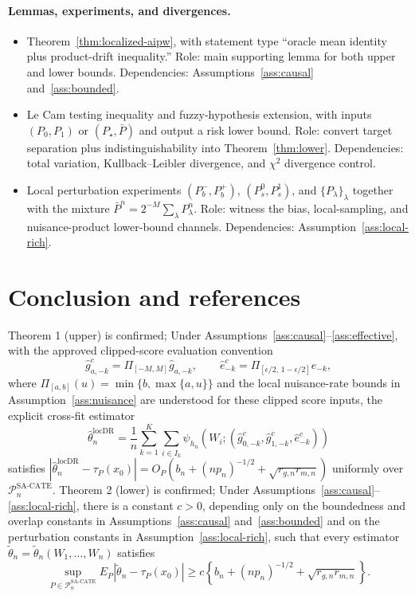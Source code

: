 \documentclass[11pt]{article}
\theoremstyle{definition}
\theoremstyle{plain}
\theoremstyle{remark}
\begin{document}
\paragraph{Lemmas, experiments, and divergences.}
\begin{itemize}[leftmargin=*]
  \item Theorem~\ref{thm:localized-aipw}, with statement type ``oracle mean identity plus product-drift inequality.'' Role: main supporting lemma for both upper and lower bounds. Dependencies: Assumptions~\ref{ass:causal} and~\ref{ass:bounded}.
  \item Le Cam testing inequality and fuzzy-hypothesis extension, with inputs $(P_0,P_1)$ or $(P_\star,\bar P)$ and output a risk lower bound. Role: convert target separation plus indistinguishability into Theorem~\ref{thm:lower}. Dependencies: total variation, Kullback--Leibler divergence, and $\chi^2$ divergence control.
  \item Local perturbation experiments $(P_b^-,P_b^+)$, $(P_s^0,P_s^1)$, and $\{P_\lambda\}_{\lambda}$ together with the mixture $\bar P^n=2^{-M}\sum_\lambda P_\lambda^n$. Role: witness the bias, local-sampling, and nuisance-product lower-bound channels. Dependencies: Assumption~\ref{ass:local-rich}.
\end{itemize}

\section{Conclusion and references}
Theorem 1 (upper) is confirmed; Under Assumptions~\ref{ass:causal}--\ref{ass:effective}, with the approved clipped-score evaluation convention
\[
\hat g^c_{a,-k}=\Pi_{[-M,M]}\hat g_{a,-k},\qquad \hat e^c_{-k}=\Pi_{[\epsilon/2,\,1-\epsilon/2]}\hat e_{-k},
\]
where $\Pi_{[a,b]}(u)=\min\{b,\max\{a,u\}\}$ and the local nuisance-rate bounds in Assumption~\ref{ass:nuisance} are understood for these clipped score inputs, the explicit cross-fit estimator
\[
\hat\theta_n^{\mathrm{locDR}} = \frac{1}{n}\sum_{k=1}^K\sum_{i\in I_k} \psi_{h_n}\!\left(W_i;(\hat g^c_{0,-k},\hat g^c_{1,-k},\hat e^c_{-k})\right)
\]
satisfies $\left|\hat\theta_n^{\mathrm{locDR}}-\tau_P(x_0)\right|=O_P\!\left(b_n+(n p_n)^{-1/2}+\sqrt{r_{g,n}r_{m,n}}\right)$ uniformly over $\mathcal{P}_n^{\mathrm{SA\text{-}CATE}}$. Theorem 2 (lower) is confirmed; Under Assumptions~\ref{ass:causal}--\ref{ass:local-rich}, there is a constant $c>0$, depending only on the boundedness and overlap constants in Assumptions~\ref{ass:causal} and~\ref{ass:bounded} and on the perturbation constants in Assumption~\ref{ass:local-rich}, such that every estimator $\tilde\theta_n=\tilde\theta_n(W_1,\ldots,W_n)$ satisfies \[ \sup_{P\in\mathcal{P}_n^{\mathrm{SA\text{-}CATE}}} E_P\!\left|\tilde\theta_n-\tau_P(x_0)\right| \ge c\left\{b_n+(n p_n)^{-1/2}+\sqrt{r_{g,n}r_{m,n}}\right\}. \]
\end{document}
